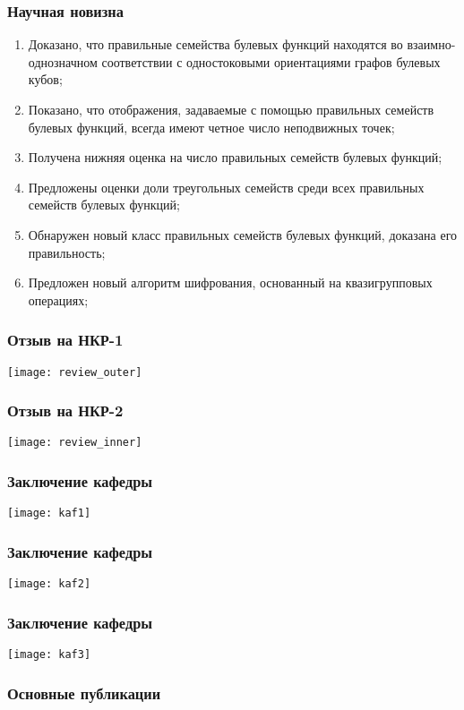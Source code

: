 \begin{frame}
    \frametitle{Научная новизна}
    \begin{enumerate}
        \item Доказано, что правильные семейства булевых функций находятся во взаимно-однозначном соответствии с одностоковыми ориентациями графов булевых кубов;
        \item Показано, что отображения, задаваемые с помощью правильных семейств булевых функций, всегда имеют четное число неподвижных точек;
        \item Получена нижняя оценка на число правильных семейств булевых функций;
        \item Предложены оценки доли треугольных семейств среди всех правильных семейств булевых функций;
        \item Обнаружен новый класс правильных семейств булевых функций, доказана его правильность;
        \item Предложен новый алгоритм шифрования, основанный на квазигрупповых операциях;
    \end{enumerate}
\end{frame}


\begin{frame}
    \frametitle{Отзыв на НКР-1}
    \centering
    \texttt{[image: review\_outer]}
\end{frame}

\begin{frame}
    \frametitle{Отзыв на НКР-2}
    \centering
    \texttt{[image: review\_inner]}
\end{frame}

\begin{frame}
    \frametitle{Заключение кафедры}
    \centering
    \texttt{[image: kaf1]}
\end{frame}

\begin{frame}
    \frametitle{Заключение кафедры}
    \centering
    \texttt{[image: kaf2]}
\end{frame}

\begin{frame}
    \frametitle{Заключение кафедры}
    \centering
    \texttt{[image: kaf3]}
\end{frame}

\begin{frame} %
    \frametitle{Основные публикации}
    \nocite{intsys20}%
    \nocite{pdm20}%
    \nocite{dm21}%
\end{frame}

